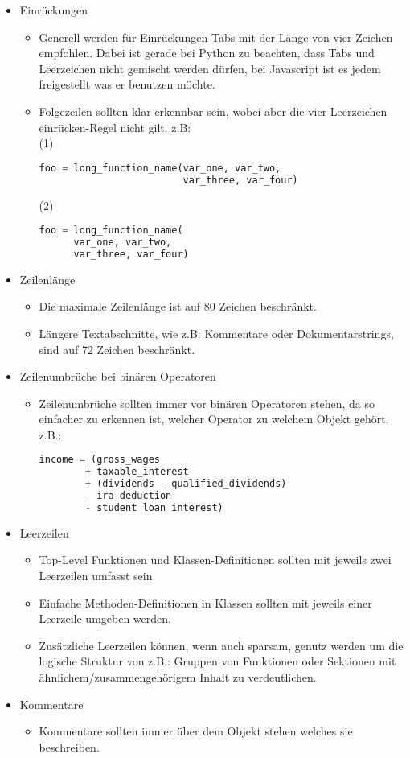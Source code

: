 \begin{itemize}
\item Einrückungen
\begin{itemize}
\item Generell werden für Einrückungen Tabs mit der Länge von vier Zeichen empfohlen. Dabei ist gerade bei Python zu beachten, dass Tabs und Leerzeichen nicht gemischt werden dürfen, bei Javascript ist es jedem freigestellt was er benutzen möchte.
\item Folgezeilen sollten klar erkennbar sein, wobei aber die \grqq vier Leerzeichen einrücken\grqq -Regel nicht gilt.
z.B: \\
(1)
\begin{lstlisting}[language=python]
foo = long_function_name(var_one, var_two,
                         var_three, var_four)
\end{lstlisting}
(2) 
\begin{lstlisting}[language=python]
foo = long_function_name(
  	  var_one, var_two,
  	  var_three, var_four)   
\end{lstlisting}
\end{itemize}
\item Zeilenlänge
\begin{itemize}
\item Die maximale Zeilenlänge ist auf 80 Zeichen beschränkt. 
\item Längere Textabschnitte, wie z.B: Kommentare oder Dokumentarstrings, sind auf 72 Zeichen beschränkt.
\end{itemize}
\item Zeilenumbrüche bei binären Operatoren
\begin{itemize}
\item Zeilenumbrüche sollten immer vor binären Operatoren stehen, da so einfacher zu erkennen ist, welcher Operator zu welchem Objekt gehört.
z.B.: 
\begin{lstlisting}[language=python]
income = (gross_wages
        + taxable_interest
        + (dividends - qualified_dividends)
        - ira_deduction
        - student_loan_interest)
\end{lstlisting}
\end{itemize}
\item Leerzeilen
\begin{itemize}
\item Top-Level Funktionen und Klassen-Definitionen sollten mit jeweils zwei Leerzeilen umfasst sein.
\item Einfache Methoden-Definitionen in Klassen sollten mit jeweils einer Leerzeile umgeben werden.
\item Zusätzliche Leerzeilen können, wenn auch sparsam, genutz werden um die logische Struktur von z.B.: Gruppen von Funktionen oder Sektionen mit ähnlichem/zusammengehörigem Inhalt zu verdeutlichen.
\end{itemize}
\item Kommentare
\begin{itemize}
\item Kommentare sollten immer über dem Objekt stehen welches sie beschreiben.
\end{itemize}
\end{itemize}

